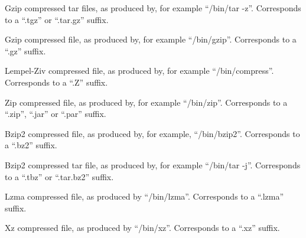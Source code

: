 \documentclass[]{article}
\begin{document}
\begin{description}
\itemsep1pt\parskip0pt
\item[tgz]
Gzip compressed tar files, as produced by, for example ``/bin/tar -z''.
Corresponds to a ``.tgz'' or ``.tar.gz'' suffix.
\end{description}

\begin{description}
\itemsep1pt\parskip0pt
\item[gz]
Gzip compressed file, as produced by, for example ``/bin/gzip''.
Corresponds to a ``.gz'' suffix.
\end{description}

\begin{description}
\itemsep1pt\parskip0pt
\item[Z]
Lempel-Ziv compressed file, as produced by, for example
``/bin/compress''. Corresponds to a ``.Z'' suffix.
\end{description}

\begin{description}
\itemsep1pt\parskip0pt
\item[zip]
Zip compressed file, as produced by, for example ``/bin/zip''.
Corresponds to a ``.zip'', ``.jar'' or ``.par'' suffix.
\end{description}

\begin{description}
\itemsep1pt\parskip0pt
\item[bz2]
Bzip2 compressed file, as produced by, for example, ``/bin/bzip2''.
Corresponds to a ``.bz2'' suffix.
\end{description}

\begin{description}
\itemsep1pt\parskip0pt
\item[tbz]
Bzip2 compressed tar file, as produced by, for example ``/bin/tar -j''.
Corresponds to a ``.tbz'' or ``.tar.bz2'' suffix.
\end{description}

\begin{description}
\itemsep1pt\parskip0pt
\item[lzma]
Lzma compressed file, as produced by ``/bin/lzma''. Corresponds to a
``.lzma'' suffix.
\end{description}

\begin{description}
\itemsep1pt\parskip0pt
\item[xz]
Xz compressed file, as produced by ``/bin/xz''. Corresponds to a ``.xz''
suffix.
\end{description}
\end{document}
